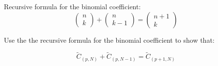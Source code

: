 \begin{frame}
Recursive formula for the binomial coefficient:
\begin{equation}
			\left( \begin{array}{c}
			n\\
			k
			\end{array}\right)+
			\left( \begin{array}{c}
			n\\
			k-1
			\end{array}\right)=
			\left( \begin{array}{c}
			n+1\\
			k
			\end{array}\right)
\end{equation}

Use the the recursive formula for the binomial coefficient to show that:

\begin{equation}
\tilde C_{(p,N)}+\tilde C_{(p,N-1)}=\tilde C_{(p+1,N)}
\end{equation}

\end{frame}


